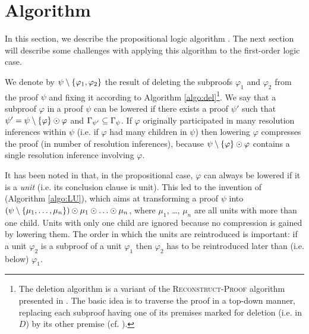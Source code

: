 
\section{Algorithm \LowerUnits}
\label{sec:PropositionalLU}

In this section, we describe the propositional logic algorithm \LowerUnits. The next section will describe some challenges with applying this algorithm to the first-order logic case.

We denote by $\psi \setminus \{\varphi_1, \varphi_2\}$ the result of deleting the subproofs $\varphi_1$ and $\varphi_2$ from the proof $\psi$ and fixing it according to Algorithm \ref{algo:del}\footnote{
The deletion algorithm is a variant of the \textsc{Reconstruct-Proof} algorithm presented in \cite{RP11}.
The basic idea is to traverse the proof in a top-down manner, replacing each subproof having one of its premises marked for deletion (i.e. in $D$) by its other premise (cf. \cite{Boudou}).
}. 
We say that a subproof $\varphi$ in a proof $\psi$ can be lowered 
if there exists a proof
$\psi'$ such that $\psi' = \psi \setminus \{\varphi\} \odot \varphi$ and
$\Gamma_{\psi'} \subseteq \Gamma_{\psi}$. If $\varphi$ originally participated in many resolution inferences within $\psi$ (i.e. if $\varphi$ had many children in $\psi$) then lowering $\varphi$ compresses the proof (in number of resolution inferences), because $\psi \setminus \{\varphi\} \odot \varphi$ contains a single resolution inference involving $\varphi$.

%
It has been noted in \cite{LURPI} that, in the propositional case, $\varphi$ can always be lowered if it is a \emph{unit} (i.e. its conclusion clause is unit). This led to the invention of {\LowerUnits} (Algorithm \ref{algo:LU}), which aims at transforming a proof $\psi$ into $(\psi \setminus \{\mu_1,\ldots,\mu_n\}) \odot \mu_1 \odot \ldots \odot \mu_n$, where $\mu_1$, \ldots, $\mu_n$ are all units with more than one child. Units with only one child are ignored because no compression is gained by lowering them. The order in which the units are reintroduced is important:
if a unit $\varphi_2$ is a subproof of a unit
$\varphi_1$ then $\varphi_2$ has to be reintroduced later than (i.e. below) $\varphi_1$.


\newlength\algowd
\def\savewd#1{\setbox0=\hbox{#1\hspace{.7in}}\algowd=\wd0\relax#1}
\newcommand\algolines[2]{\savewd{#1}%
  \tcp*{\parbox[t]{\dimexpr\algowidth-\algowd}{#2}}}




